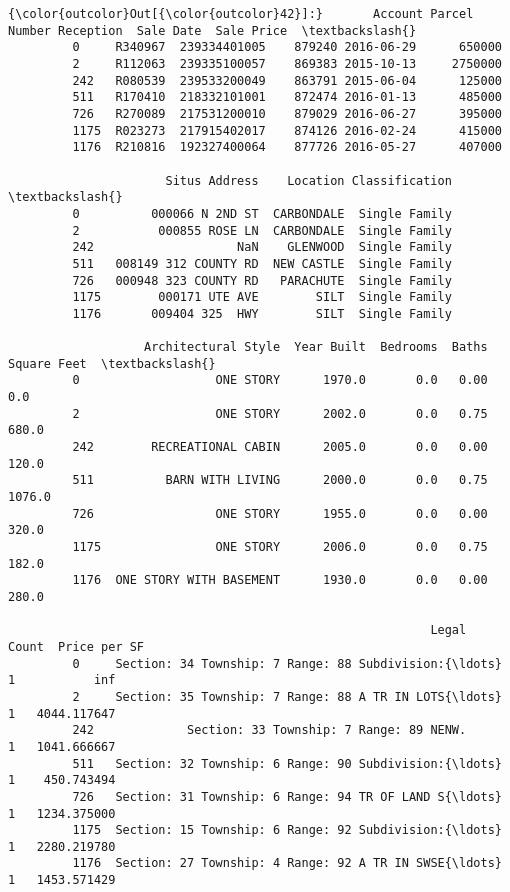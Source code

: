 \documentclass[11pt]{article}
\begin{document}
\begin{Verbatim}[commandchars=\\\{\}]
{\color{outcolor}Out[{\color{outcolor}42}]:}       Account Parcel Number Reception  Sale Date  Sale Price  \textbackslash{}
         0     R340967  239334401005    879240 2016-06-29      650000   
         2     R112063  239335100057    869383 2015-10-13     2750000   
         242   R080539  239533200049    863791 2015-06-04      125000   
         511   R170410  218332101001    872474 2016-01-13      485000   
         726   R270089  217531200010    879029 2016-06-27      395000   
         1175  R023273  217915402017    874126 2016-02-24      415000   
         1176  R210816  192327400064    877726 2016-05-27      407000   
         
                      Situs Address    Location Classification  \textbackslash{}
         0          000066 N 2ND ST  CARBONDALE  Single Family   
         2           000855 ROSE LN  CARBONDALE  Single Family   
         242                    NaN    GLENWOOD  Single Family   
         511   008149 312 COUNTY RD  NEW CASTLE  Single Family   
         726   000948 323 COUNTY RD   PARACHUTE  Single Family   
         1175        000171 UTE AVE        SILT  Single Family   
         1176       009404 325  HWY        SILT  Single Family   
         
                   Architectural Style  Year Built  Bedrooms  Baths  Square Feet  \textbackslash{}
         0                   ONE STORY      1970.0       0.0   0.00          0.0   
         2                   ONE STORY      2002.0       0.0   0.75        680.0   
         242        RECREATIONAL CABIN      2005.0       0.0   0.00        120.0   
         511          BARN WITH LIVING      2000.0       0.0   0.75       1076.0   
         726                 ONE STORY      1955.0       0.0   0.00        320.0   
         1175                ONE STORY      2006.0       0.0   0.75        182.0   
         1176  ONE STORY WITH BASEMENT      1930.0       0.0   0.00        280.0   
         
                                                           Legal  Count  Price per SF  
         0     Section: 34 Township: 7 Range: 88 Subdivision:{\ldots}      1           inf  
         2     Section: 35 Township: 7 Range: 88 A TR IN LOTS{\ldots}      1   4044.117647  
         242             Section: 33 Township: 7 Range: 89 NENW.      1   1041.666667  
         511   Section: 32 Township: 6 Range: 90 Subdivision:{\ldots}      1    450.743494  
         726   Section: 31 Township: 6 Range: 94 TR OF LAND S{\ldots}      1   1234.375000  
         1175  Section: 15 Township: 6 Range: 92 Subdivision:{\ldots}      1   2280.219780  
         1176  Section: 27 Township: 4 Range: 92 A TR IN SWSE{\ldots}      1   1453.571429  
\end{Verbatim}
            
\end{document}
